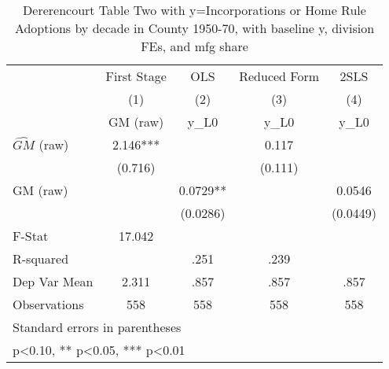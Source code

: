 \begin{table}[htbp]\centering
\def\sym#1{\ifmmode^{#1}\else\(^{#1}\)\fi}
\caption{Dererencourt Table Two with y=Incorporations or Home Rule Adoptions by decade in County 1950-70, with baseline y, division FEs, and mfg share}
\begin{tabular}{l*{4}{c}}
\toprule
                    & First Stage   &         OLS   &Reduced Form   &        2SLS   \\
                    &\multicolumn{1}{c}{(1)}&\multicolumn{1}{c}{(2)}&\multicolumn{1}{c}{(3)}&\multicolumn{1}{c}{(4)}\\
                    &\multicolumn{1}{c}{GM  (raw)}&\multicolumn{1}{c}{y\_L0}&\multicolumn{1}{c}{y\_L0}&\multicolumn{1}{c}{y\_L0}\\
\midrule
$\hat{GM}$ (raw)    &       2.146***&               &       0.117   &               \\
                    &     (0.716)   &               &     (0.111)   &               \\
\addlinespace
GM  (raw)           &               &      0.0729** &               &      0.0546   \\
                    &               &    (0.0286)   &               &    (0.0449)   \\
\midrule
F-Stat              &      17.042   &               &               &               \\
R-squared           &               &        .251   &        .239   &               \\
Dep Var Mean        &       2.311   &        .857   &        .857   &        .857   \\
Observations        &         558   &         558   &         558   &         558   \\
\bottomrule
\multicolumn{5}{l}{\footnotesize Standard errors in parentheses}\\
\multicolumn{5}{l}{\footnotesize * p<0.10, ** p<0.05, *** p<0.01}\\
\end{tabular}
\end{table}
